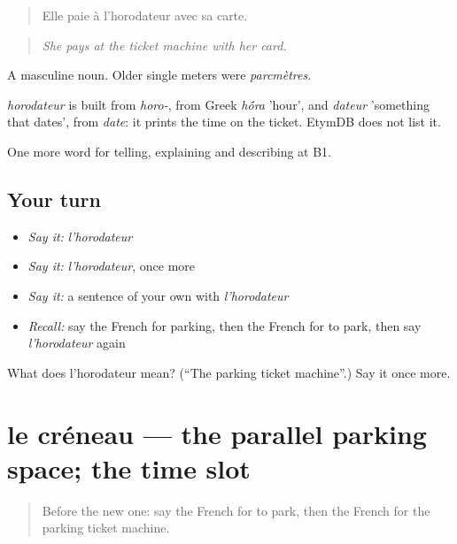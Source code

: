 \begin{quote}
Elle paie à l'horodateur avec sa carte.
\end{quote}

\begin{quote}
\emph{She pays at the ticket machine with her card.}
\end{quote}

A masculine noun. Older single meters were \emph{parcmètres}.

\begin{cousinweb}
\emph{horodateur} is built from \emph{horo-}, from Greek \emph{h\'{\={o}}ra} 'hour', and \emph{dateur} 'something that dates', from \emph{date}: it prints the time on the ticket. EtymDB does not list it.
\end{cousinweb}

\begin{grammarlens}[title={What you've built}]
One more word for telling, explaining and describing at B1.
\end{grammarlens}

\subsection*{Your turn}
\begin{itemize}
\raggedright
  \item \emph{Say it:} \emph{l'horodateur}
  \item \emph{Say it:} \emph{l'horodateur}, once more
  \item \emph{Say it:} a sentence of your own with \emph{l'horodateur}
  \item \emph{Recall:} say the French for parking, then the French for to park, then say \emph{l'horodateur} again
\end{itemize}

\begin{tcolorbox}[breakable,colback=teal!4,colframe=teal!35!black,title={Before you move on}]
What does l'horodateur mean? (\textquotedblleft{}The parking ticket machine\textquotedblright{}.) Say it once more.
\end{tcolorbox}
\section[le créneau]{le créneau — the parallel parking space; the time slot}

\label{lesson:FR-C407-creneau}



\begin{quote}
Before the new one: say the French for to park, then the French for the parking ticket machine.
\end{quote}

